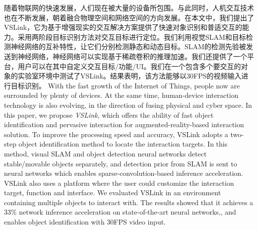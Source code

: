 \cleardoublepage
{}
随着物联网的快速发展，人们现在被大量的设备所包围。与此同时，人机交互技术也在不断发展，朝着融合物理空间和网络空间的方向发展。在本文中，我们提出了VSLink，它为基于增强现实的交互解决方案提供了快速对象识别和普适交互的能力。采用两阶段目标识别方法对交互目标进行定位。我们利用视觉SLAM和目标检测神经网络的互补特性，让它们分别检测静态和动态目标。SLAM的检测先验被发送到神经网络，神经网络可以实现基于稀疏卷积的推理加速。我们还提供了一个平台，用户可以在其中自定义交互目标/功能/UI。我们在一个包含多个要交互的对象的实验室环境中测试了VSLink。结果表明，该方法能够以30FPS的视频输入进行目标识别。
\cleardoublepage
{}
With the fast growth of the Internet of Things, people now are surrounded by plenty of devices.
At the same time, human-device interaction technology is also evolving, in the direction of fusing physical and cyber space.
In this paper, we propose \textit{VSLink}, which offers the ability of fast object identification and pervasive interaction for augmented-reality-based interaction solution.
To improve the processing speed and accuracy, VSLink adopts a two-step object identification method to locate the interaction targets.
In this method, visual SLAM and object detection neural networks detect stable/movable objects separately, and detection prior from SLAM is sent to neural networks which enables sparse-convolution-based inference acceleration.
VSLink also uses a platform where the user could customize the interaction target, function and interface.
We evaluated VSLink in an environment containing multiple objects to interact with. 
The results showed that it achieves a 33\% network inference acceleration on state-of-the-art neural networks,, and enables object identification with 30FPS video input.
